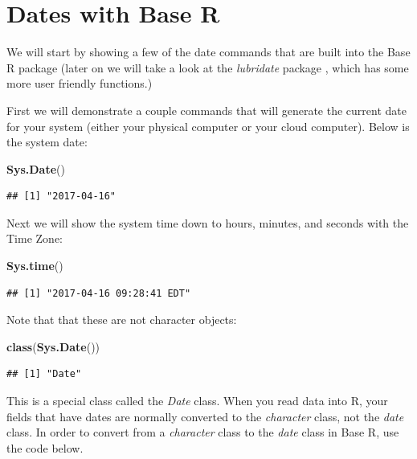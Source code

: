 \documentclass[]{book}
\newenvironment{Shaded}{\begin{snugshade}}{\end{snugshade}}
\newcommand{\KeywordTok}[1]{\textcolor[rgb]{0.13,0.29,0.53}{\textbf{{#1}}}}
\newcommand{\NormalTok}[1]{{#1}}
\begin{document}
\section{Dates with Base R}\label{dates-with-base-r}

We will start by showing a few of the date commands that are built into
the Base R package (later on we will take a look at the \emph{lubridate}
package \citep{R-lubridate}, which has some more user friendly
functions.)

First we will demonstrate a couple commands that will generate the
current date for your system (either your physical computer or your
cloud computer). Below is the system date:

\begin{Shaded}
\begin{Highlighting}[]
\KeywordTok{Sys.Date}\NormalTok{()}
\end{Highlighting}
\end{Shaded}

\begin{verbatim}
## [1] "2017-04-16"
\end{verbatim}

Next we will show the system time down to hours, minutes, and seconds
with the Time Zone:

\begin{Shaded}
\begin{Highlighting}[]
\KeywordTok{Sys.time}\NormalTok{()}
\end{Highlighting}
\end{Shaded}

\begin{verbatim}
## [1] "2017-04-16 09:28:41 EDT"
\end{verbatim}

Note that that these are not character objects:

\begin{Shaded}
\begin{Highlighting}[]
\KeywordTok{class}\NormalTok{(}\KeywordTok{Sys.Date}\NormalTok{())}
\end{Highlighting}
\end{Shaded}

\begin{verbatim}
## [1] "Date"
\end{verbatim}

This is a special class called the \emph{Date} class. When you read data
into R, your fields that have dates are normally converted to the
\emph{character} class, not the \emph{date} class. In order to convert
from a \emph{character} class to the \emph{date} class in Base R, use
the code below.
\end{document}
